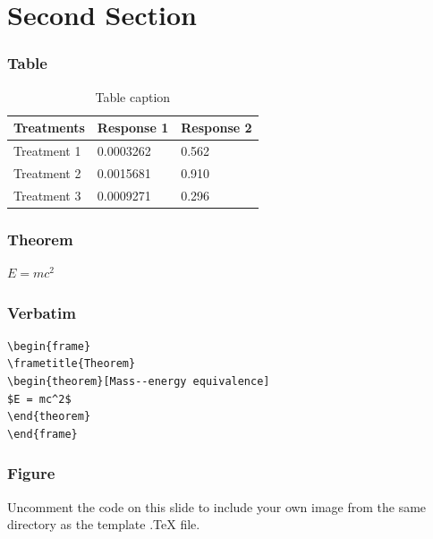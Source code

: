 \documentclass[t]{beamer}
\begin{document}
\section{Second Section}

\begin{frame}
\frametitle{Table}
\begin{table}
\begin{tabular}{l l l}
\toprule
\textbf{Treatments} & \textbf{Response 1} & \textbf{Response 2}\\
\midrule
Treatment 1 & 0.0003262 & 0.562 \\
Treatment 2 & 0.0015681 & 0.910 \\
Treatment 3 & 0.0009271 & 0.296 \\
\bottomrule
\end{tabular}
\caption{Table caption}
\end{table}
\end{frame}


\begin{frame}
\frametitle{Theorem}
\begin{theorem}
$E = mc^2$
\end{theorem}
\end{frame}


\begin{frame}[fragile] %
\frametitle{Verbatim}
\begin{example}
\begin{verbatim}
\begin{frame}
\frametitle{Theorem}
\begin{theorem}[Mass--energy equivalence]
$E = mc^2$
\end{theorem}
\end{frame}\end{verbatim}
\end{example}
\end{frame}


\begin{frame}
\frametitle{Figure}
Uncomment the code on this slide to include your own image from the same directory as the template .TeX file.
\end{frame}
\end{document}
